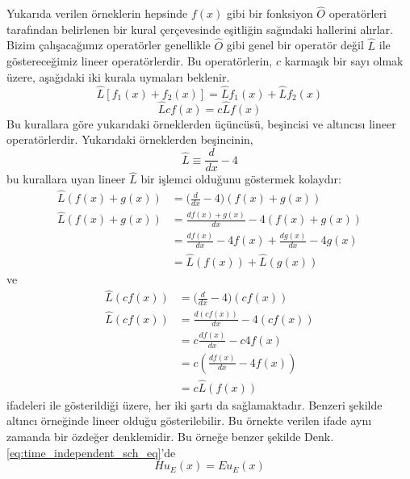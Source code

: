 \documentclass[00_kitap.tex]{subfiles}
\begin{document}
Yukarıda verilen örneklerin hepsinde $f(x)$ gibi bir fonksiyon $\hat O$ operatörleri tarafından belirlenen bir kural çerçevesinde eşitliğin sağındaki hallerini alırlar. Bizim çalışacağımız operatörler genellikle $\hat O$ gibi genel bir operatör değil $\hat L$ ile göstereceğimiz lineer operatörlerdir. Bu operatörlerin, $c$ karmaşık bir sayı olmak üzere, aşağıdaki iki kurala uymaları beklenir.
\begin{equation}
\hat L \left[ f _ { 1 } ( x ) + f _ { 2 } ( x ) \right] = \hat  L f _ { 1 } ( x ) + \hat  L f _ { 2 } ( x )
\end{equation}
\begin{equation}
\hat L c f ( x ) = c \hat L f ( x )
\end{equation}
Bu kurallara göre yukarıdaki örneklerden üçüncüsü, beşincisi ve altıncısı  lineer operatörlerdir. Yukarıdaki örneklerden beşincinin,
\begin{equation*}
\hat  L \equiv \frac { d  } { d x } - 4 
\end{equation*}
bu kurallara uyan lineer $\hat L$ bir işlemci olduğunu göstermek kolaydır:
\begin{align*}
\hat  L (f ( x ) + g(x)) &= \bigg(\frac { d } { d x } - 4\bigg) (f ( x ) + g(x))\\
\hat  L (f ( x ) + g(x)) &= \frac { d f ( x ) + g(x)} { d x } - 4 (f ( x ) + g ( x ))\\
&= \frac { d f ( x ) } { d x } - 4 f ( x ) + \frac { d g ( x ) } { d x } - 4 g ( x ) \\
&= \hat  L (f ( x )) + \hat  L (g ( x ))
\end{align*}
ve
\begin{align*}
\hat  L (c f( x )) &= \bigg(\frac { d } { d x } - 4\bigg) (c f( x ))\\
\hat  L (c f ( x )) &= \frac { d (c f ( x ))} { d x } - 4 (c f ( x ))\\
&= c\frac { d f ( x ) } { d x } - c 4 f ( x ) \\
&= c(\frac { d f ( x ) } { d x } -  4 f ( x )) \\
&=  c \hat L (f ( x ))
\end{align*}
ifadeleri ile gösterildiği üzere, her iki şartı da sağlamaktadır. Benzeri şekilde altıncı örneğinde lineer olduğu gösterilebilir. Bu örnekte verilen ifade aynı zamanda bir özdeğer denklemidir. Bu örneğe benzer şekilde Denk. \ref{eq:time_independent_sch_eq}'de
\begin{equation}
H u_{E}(x)=E u_{E}(x)
\end{equation}
\end{document}
